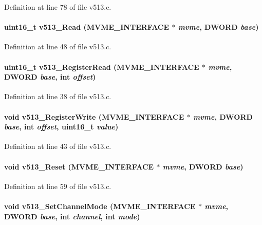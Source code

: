 Definition at line 78 of file v513.c.
\paragraph[{v513\_\-Read}]{\setlength{\rightskip}{0pt plus 5cm}uint16\_\-t v513\_\-Read ({\bf MVME\_\-INTERFACE} $\ast$ {\em mvme}, \/  {\bf DWORD} {\em base})}\hfill\label{v513_8c_a3852c38688f99443a74359b32e795196}


Definition at line 48 of file v513.c.
\paragraph[{v513\_\-RegisterRead}]{\setlength{\rightskip}{0pt plus 5cm}uint16\_\-t v513\_\-RegisterRead ({\bf MVME\_\-INTERFACE} $\ast$ {\em mvme}, \/  {\bf DWORD} {\em base}, \/  int {\em offset})}\hfill\label{v513_8c_aa3b74d0b3e46110157c2e1a794cd776e}


Definition at line 38 of file v513.c.
\paragraph[{v513\_\-RegisterWrite}]{\setlength{\rightskip}{0pt plus 5cm}void v513\_\-RegisterWrite ({\bf MVME\_\-INTERFACE} $\ast$ {\em mvme}, \/  {\bf DWORD} {\em base}, \/  int {\em offset}, \/  uint16\_\-t {\em value})}\hfill\label{v513_8c_a06b9ab73791fd1ce7a8fdf26a8a229dd}


Definition at line 43 of file v513.c.
\paragraph[{v513\_\-Reset}]{\setlength{\rightskip}{0pt plus 5cm}void v513\_\-Reset ({\bf MVME\_\-INTERFACE} $\ast$ {\em mvme}, \/  {\bf DWORD} {\em base})}\hfill\label{v513_8c_a0e4ce80f6a7cdc07e4aae15cd970b457}


Definition at line 59 of file v513.c.
\paragraph[{v513\_\-SetChannelMode}]{\setlength{\rightskip}{0pt plus 5cm}void v513\_\-SetChannelMode ({\bf MVME\_\-INTERFACE} $\ast$ {\em mvme}, \/  {\bf DWORD} {\em base}, \/  int {\em channel}, \/  int {\em mode})}\hfill\label{v513_8c_aab9cddf392795f3f9e744bb4d0ef9236}


